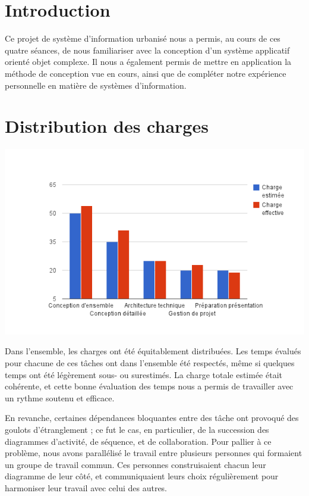 
\section{Introduction}

Ce projet de système d'information urbanisé nous a permis, au cours de ces quatre séances, de nous familiariser avec la conception d'un système applicatif orienté objet complexe. Il nous a également permis de mettre en application la méthode de conception vue en cours, ainsi que de compléter notre expérience personnelle en matière de systèmes d'information.

\section{Distribution des charges}

\begin {center}
\includegraphics[width=\textwidth]{charges-effectives.png}
\end {center}

Dans l'ensemble, les charges ont été équitablement distribuées. Les temps évalués pour chacune de ces tâches ont dans l'ensemble été respectés, même si quelques temps ont été légèrement sous- ou surestimés. La charge totale estimée était cohérente, et cette bonne évaluation des temps nous a permis de travailler avec un rythme soutenu et efficace.

En revanche, certaines dépendances bloquantes entre des tâche ont provoqué des goulots d'étranglement ; ce fut le cas, en particulier, de la succession des diagrammes d'activité, de séquence, et de collaboration. Pour pallier à ce problème, nous avons parallélisé le travail entre plusieurs personnes qui formaient un groupe de travail commun. Ces personnes construisaient chacun leur diagramme de leur côté, et communiquaient leurs choix régulièrement pour harmoniser leur travail avec celui des autres.

